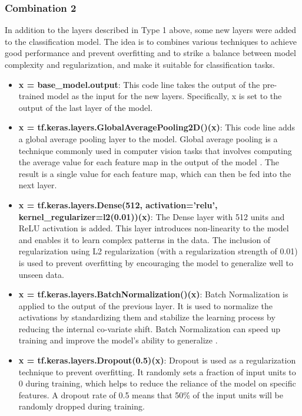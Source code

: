 
\subsubsection{Combination 2}
\label{subsubsec:variation_2}

In addition to the layers described in Type 1 above, some new layers were added to the classification model. The idea is to combines various techniques to achieve good performance and prevent overfitting and to strike a balance between model complexity and regularization, and make it suitable for classification tasks.

\begin{itemize}
    \item \textbf{x = base\_model.output}: This code line takes the output of the pre-trained model as the input for the new layers. Specifically, x is set to the output of the last layer of the model.
    \item \textbf{x = tf.keras.layers.GlobalAveragePooling2D()(x)}: This code line adds a global average pooling layer to the model. Global average pooling is a technique commonly used in computer vision tasks that involves computing the average value for each feature map in the output of the model \cite{lin2013network}. The result is a single value for each feature map, which can then be fed into the next layer.
    \item \textbf{x = tf.keras.layers.Dense(512, activation='relu', kernel\_regularizer=l2(0.01))(x)}: The Dense layer with 512 units and ReLU activation is added. This layer introduces non-linearity to the model and enables it to learn complex patterns in the data. The inclusion of regularization using L2 regularization (with a regularization strength of 0.01) is used to prevent overfitting by encouraging the model to generalize well to unseen data.
    \item \textbf{x = tf.keras.layers.BatchNormalization()(x)}: Batch Normalization is applied to the output of the previous layer. It is used to normalize the activations by standardizing them and stabilize the learning process by reducing the internal co-variate shift. Batch Normalization can speed up training and improve the model's ability to generalize \cite{ioffe2015batch}.
    \item \textbf{x = tf.keras.layers.Dropout(0.5)(x)}: Dropout is used as a regularization technique to prevent overfitting. It randomly sets a fraction of input units to 0 during training, which helps to reduce the reliance of the model on specific features. A dropout rate of 0.5 means that 50\% of the input units will be randomly dropped during training.

\end{itemize}
